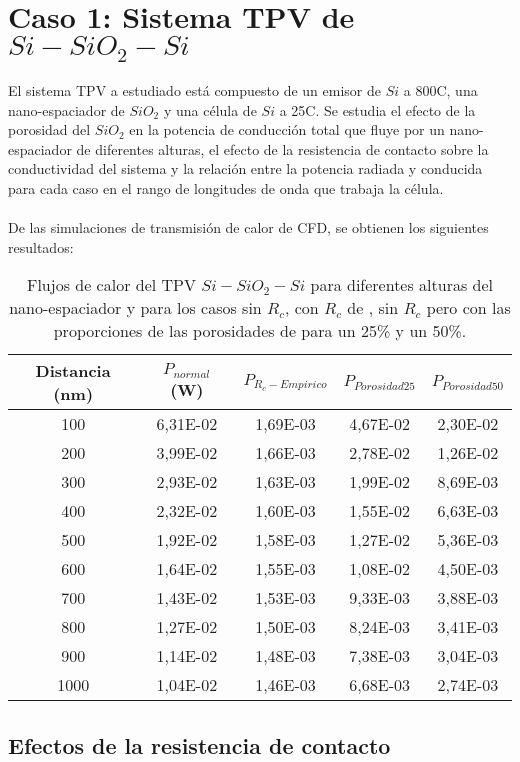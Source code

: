 \section{Caso 1: Sistema TPV de $Si-SiO_2-Si$}
El sistema TPV a estudiado está compuesto de un emisor de $Si$ a 800\textdegree C, una nano-espaciador de $SiO_2$ y una célula de $Si$ a 25\textdegree C. Se estudia el efecto de la porosidad del $SiO_2$ en la potencia de conducción total que fluye por un nano-espaciador de diferentes alturas, el efecto de la resistencia de contacto sobre la conductividad del sistema y la relación entre la potencia radiada y conducida para cada caso en el rango de longitudes de onda que trabaja la célula.\\\\
De las simulaciones de transmisión de calor de CFD, se obtienen los siguientes resultados:
\begin{table}[H]
	\centering
		\begin{tabular}{|c||c|c|c|c|}
		\hline
			Distancia (nm)&$P_{normal}$ (W)&$P_{R_c-Empirico}$&$P_{Porosidad25}$&$P_{Porosidad50}$\\ \hline \hline
			100&6,31E-02&1,69E-03&4,67E-02&2,30E-02\\ \hline
			200&3,99E-02&1,66E-03&2,78E-02&1,26E-02\\ \hline
			300&2,93E-02&1,63E-03&1,99E-02&8,69E-03\\ \hline
			400&2,32E-02&1,60E-03&1,55E-02&6,63E-03\\ \hline
			500&1,92E-02&1,58E-03&1,27E-02&5,36E-03\\ \hline
			600&1,64E-02&1,55E-03&1,08E-02&4,50E-03\\ \hline
			700&1,43E-02&1,53E-03&9,33E-03&3,88E-03\\ \hline
			800&1,27E-02&1,50E-03&8,24E-03&3,41E-03\\ \hline
			900&1,14E-02&1,48E-03&7,38E-03&3,04E-03\\ \hline
			1000&1,04E-02&1,46E-03&6,68E-03&2,74E-03\\ \hline
		\end{tabular}
	\caption{Flujos de calor del TPV $Si-SiO_2-Si$ para diferentes alturas del nano-espaciador y para los casos sin $R_c$, con $R_c$ de \cite{nf_TPV_Pillars_SiO2}, sin $R_c$ pero con las proporciones de las porosidades de \cite{ThermalConductivity_SiO2_2018} para un 25\% y un 50\%.}
	\label{tab:condTerSiSiO2Si}
\end{table}
\subsection{Efectos de la resistencia de contacto}



